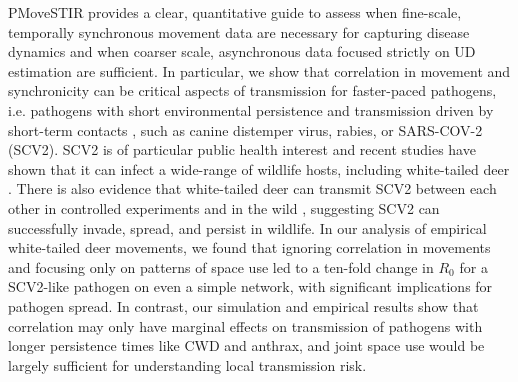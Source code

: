 ﻿\documentclass[11pt]{article}
\begin{document}

PMoveSTIR provides a clear, quantitative guide to assess when fine-scale, temporally synchronous movement data are necessary for capturing disease dynamics and when coarser scale, asynchronous data focused strictly on UD estimation are sufficient. 
In particular, we show that correlation in movement and synchronicity can be critical aspects of transmission for faster-paced pathogens, i.e. pathogens with short environmental persistence and transmission driven by short-term contacts \citep[cf.][]{Dougherty2018,Manlove2022}, such as canine distemper virus, rabies, or SARS-COV-2 (SCV2). 
SCV2 is of particular public health interest and recent studies have shown that it can infect a wide-range of wildlife hosts, including white-tailed deer \citep{Palmer2021,Hale2022}. There is also evidence that white-tailed deer can transmit SCV2 between each other in controlled experiments and in the wild \citep{Martins2022,Hale2022}, suggesting SCV2 can successfully invade, spread, and persist in wildlife.  In our analysis of empirical white-tailed deer movements, we found that ignoring correlation in movements and focusing only on patterns of space use led to a ten-fold change in $R_0$ for a SCV2-like pathogen on even a simple network, with significant implications for pathogen spread.  In contrast, our simulation and empirical results show that correlation may only have marginal effects on transmission of pathogens with longer persistence times like CWD and anthrax, and joint space use would be largely sufficient for understanding local transmission risk.


\end{document}
